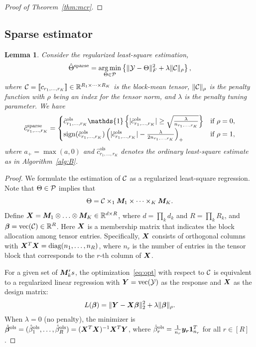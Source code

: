 \documentclass{article}
\newtheorem{lemma}{Lemma}
\begin{document}
\begin{appendices}
\begin{proof}[Proof of Theorem~\ref{thm:mcr}]
\end{proof}



\subsection{Sparse estimator}
\begin{lemma}\label{prop:sparse}
Consider the regularized least-square estimation,
\begin{equation}\label{eq:opt}
\hat \Theta^{\text{sparse}}=\operatorname*{arg\,min}_{\Theta\in \mathcal{P}}\left\{\lVert\mathcal{Y}-\Theta\rVert_F^2+\lambda \lVert\mathcal{C}\rVert_\rho
\right\},
\end{equation}
where $\mathcal{C}=\llbracket c_{r_1,\ldots,r_K} \rrbracket\in\mathbb{R}^{R_1\times \cdots\times R_K}$ is the block-mean tensor, $\lVert\mathcal{C}\rVert_\rho$ is the penalty function with $\rho$ being an index for the tensor norm, and $\lambda$ is the penalty tuning parameter. We have
\begin{equation}\label{eq:lasso}
\hat c^{\text{sparse}}_{r_1,\ldots,r_K}=
\begin{cases}
\hat c^{\text{ols}}_{r_1,\ldots,r_K}\mathds{1}\left\{|\hat c^{\text{ols}}_{r_1,\ldots,r_K} |\geq {\sqrt{\lambda \over n_{r_1,\ldots,r_K}}}\right\} & \text{if}\ \rho=0,\\
\text{sign}(\hat c^{\text{ols}}_{r_1,\ldots,r_K})\left( |\hat c^{\text{ols}}_{r_1,\ldots,r_K}|-{\lambda \over 2n_{r_1,\ldots,r_K}}  \right)_{+} &\text{if}\ \rho=1,
\end{cases}
\end{equation}
where $a_{+}=\max(a,0)$ and $\hat c^{\text{ols}}_{r_1,\ldots,r_K}$ denotes the ordinary least-square estimate as in Algorithm~\ref{alg:B}. 
\end{lemma}

\begin{proof}
We formulate the estimation of $\mathcal{C}$ as a regularized least-square regression. Note that $\Theta\in\mathcal{P}$ implies that
\[
\Theta=\mathcal{C}\times_1\bm M_1\times \cdots \times_K \bm M_K.
\]
Define $\bm X=\bm M_1\otimes \ldots \otimes \bm M_K\in \mathbb{R}^{d\times R}$, where $d=\prod_k d_k$ and $R=\prod_k R_k$, and ${\bm \beta}=\text{vec}(\mathcal{C})\in\mathbb{R}^R$. Here $\bm X$ is a membership matrix that indicates the block allocation among tensor entries. Specifically, $\bm X$ consists of orthogonal columns with $\bm X^T\bm X=\text{diag}(n_1,\ldots,n_R)$, where $n_r$ is the number of entries in the tensor block that corresponds to the $r$-th column of $\bm X$.

For a given set of $\bm M_k's$, the optimization~\eqref{eq:opt} with respect to $\mathcal{C}$ is equivalent to a regularized linear regression with $\bm Y=\text{vec}(\mathcal{Y})$ as the response and $\bm X$ as the design matrix:
\begin{equation}\label{eq:opt}
L({\bm \beta})=\lVert\bm Y-\bm X \bm{\beta}\rVert_2^2+\lambda\lVert\bm{\beta}\rVert_\rho.
\end{equation}
When $\lambda=0$ (no penalty), the minimizer is $\hat {\bm \beta}^{\text{ols}}=(\hat \beta^{\text{ols}}_1,\ldots,\hat \beta^{\text{ols}}_R)=(\bm X^T\bm X)^{-1}\bm X^T\bm Y$, where $\hat \beta^{\text{ols}}_r={1\over n_r}\bm{y}_{\bm{r}}\mathbf{1}^T_{n_r}$ for all $r\in[R]$.


\end{proof}
\end{appendices}
\end{document}
